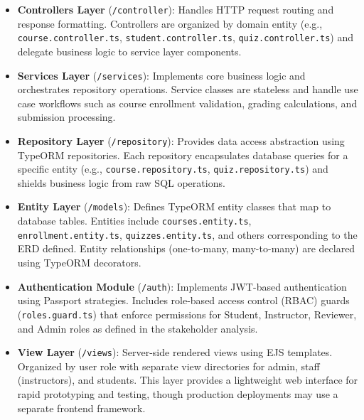 \begin{itemize}
    \item \textbf{Controllers Layer} (\texttt{/controller}): Handles HTTP request routing and response 
    formatting. Controllers are organized by domain entity (e.g., \texttt{course.controller.ts}, 
    \texttt{student.controller.ts}, \texttt{quiz.controller.ts}) and delegate business logic to 
    service layer components.
    
    \item \textbf{Services Layer} (\texttt{/services}): Implements core business logic and orchestrates 
    repository operations. Service classes are stateless and handle use case workflows such as course 
    enrollment validation, grading calculations, and submission processing.
    
    \item \textbf{Repository Layer} (\texttt{/repository}): Provides data access abstraction using 
    TypeORM repositories. Each repository encapsulates database queries for a specific entity 
    (e.g., \texttt{course.repository.ts}, \texttt{quiz.repository.ts}) and shields business logic 
    from raw SQL operations.
    
    \item \textbf{Entity Layer} (\texttt{/models}): Defines TypeORM entity classes that map to database 
    tables. Entities include \texttt{courses.entity.ts}, \texttt{enrollment.entity.ts}, 
    \texttt{quizzes.entity.ts}, and others corresponding to the ERD defined. Entity relationships 
    (one-to-many, many-to-many) are declared using TypeORM decorators.
    
    \item \textbf{Authentication Module} (\texttt{/auth}): Implements JWT-based authentication using 
    Passport strategies. Includes role-based access control (RBAC) guards (\texttt{roles.guard.ts}) 
    that enforce permissions for Student, Instructor, Reviewer, and Admin roles as defined in the 
    stakeholder analysis.
    
    \item \textbf{View Layer} (\texttt{/views}): Server-side rendered views using EJS templates. 
    Organized by user role with separate view directories for admin, staff (instructors), and students. 
    This layer provides a lightweight web interface for rapid prototyping and testing, though production 
    deployments may use a separate frontend framework.
\end{itemize}

